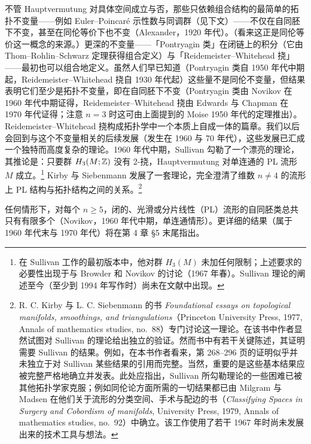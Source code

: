 不管 Hauptvermutung 对具体空间成立与否，那些只依赖组合结构的最简单的拓扑不变量——例如 Euler--Poincaré 示性数与同调群（见下文）——不仅在自同胚下不变，甚至在同伦等价下也不变（Alexander，1920 年代）。（看来这正是同伦等价这一概念的来源。）更深的不变量——「Pontryagin 类」在闭链上的积分（它由 Thom--Rohlin--Schwarz 定理获得组合定义）与「Reidemeister--Whitehead 挠」——最初也可以组合地定义。虽然人们早已知道（Pontryagin 类自 1950 年代中期起，Reidemeister--Whitehead 挠自 1930 年代起）这些量不是同伦不变量，但结果表明它们至少是拓扑不变量，即在自同胚下不变（Pontryagin 类由 Novikov 在 1960 年代中期证得，Reidemeister--Whitehead 挠由 Edwards 与 Chapman 在 1970 年代证得；注意 $n=3$ 时这可由上面提到的 Moise 1950 年代的定理推出）。Reidemeister--Whitehead 挠构成拓扑学中一个本质上自成一体的篇章。我们以后会回到与这个不变量相关的后续发展（发生在 1960 与 70 年代），这些发展已汇成一个独特而高度复杂的理论。1960 年代中期，Sullivan 勾勒了一个漂亮的理论，其推论是：只要群 $H_3(M;\mathbb{Z})$ 没有 2-挠，Hauptvermutung 对单连通的 PL 流形 $M$ 成立。\footnote{在 Sullivan 工作的最初版本中，他对群 $H_3(M)$ 未加任何限制；上述要求的必要性出现于与 Browder 和 Novikov 的讨论（1967 年春）。Sullivan 理论的阐述至今（至少到 1994 年写作时）尚未在文献中出现。} Kirby 与 Siebenmann 发展了一套理论，完全澄清了维数 $n\ne4$ 的流形上 PL 结构与拓扑结构之间的关系。\footnote{R. C. Kirby 与 L. C. Siebenmann 的书 \emph{Foundational essays on topological manifolds, smoothings, and triangulations}（Princeton University Press, 1977, Annals of mathematics studies, no.~88）专门讨论这一理论。在该书中作者显然试图对 Sullivan 的理论给出独立的验证。然而书中有若干关键陈述，其证明需要 Sullivan 的结果。例如，在本书作者看来，第 268--296 页的证明似乎并未独立于对 Sullivan 某些结果的引用而完整。当然，重要的是这些基本结果应被完整严格地确立并发表。此处应指出，Sullivan 所勾勒理论的一些困难已被
其他拓扑学家克服；例如同伦论方面所需的一切结果都已由 Milgram 与 Madsen 在他们关于流形的分类空间、手术与配边的书（\emph{Classifying Spaces in Surgery and Cobordism of manifolds}, University Press, 1979, Annals of mathematics studies, no.~92）中确立。该工作使用了若干 1967 年时尚未发展出来的技术工具与想法。}

任何情形下，对每个 $n\ge5$，闭的、光滑或分片线性（PL）流形的自同胚类总共只有有限多个（Novikov，1960 年代中期，单连通情形）。更详细的结果（属于 1960 年代末与 1970 年代）将在第 4 章 §5 末尾指出。

